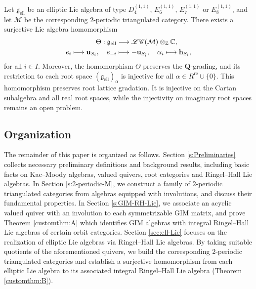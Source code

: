 \documentclass[12pt,reqno]{amsart}
\numberwithin{equation}{section}
\newenvironment{customthm}[1]
{\renewcommand\theinnercustomthm{#1}\innercustomthm}
{\endinnercustomthm}
\begin{document}
	
	\begin{customthm}{{\bf B}}[Theorem \ref{thm:relization-ell-Lie}]
		\label{customthm:B}
		Let $\mathfrak{g}_{\mathrm{ell}}$ be an elliptic Lie algebra of type $D_4^{(1,1)}$, $E_6^{(1,1)}$, $E_7^{(1,1)}$ or $E_8^{(1,1)}$, and let $\mathcal{M}$ be the corresponding $2$-periodic triangulated category. There exists a surjective Lie algebra homomorphism
		\begin{align*}
			\Theta:\mathfrak{g}_{\mathrm{ell}} &\longrightarrow \mathscr{LC}(\mathcal{M})\otimes_{\mathbb{Z}}\mathbb{C},\\
			e_i \longmapsto {\bf u}_{S_i},\quad
			e_{-i} &\longmapsto -{\bf u}_{ S_{\bar i}},\quad
			\alpha_i \longmapsto {\bf h}_{S_i},
		\end{align*}
		for all $i\in I$.
		Moreover, the homomorphism $\Theta$ preserves the $\mathbf{Q}$-grading, and its restriction to each root space $(\mathfrak{g}_{\mathrm{ell}})_\alpha$ is injective for all $\alpha\in R^{\mathrm{re}}\cup\{0\}$.
	\end{customthm}
	This homomorphism preserves root lattice gradation. It is injective on the Cartan subalgebra and all real root spaces, while the injectivity on imaginary root spaces remains an open problem.
	
	
	\subsection{Organization}
	The remainder of this paper is organized as follows. Section \ref{s:Preliminaries} collects necessary preliminary definitions and background results, including basic facts on Kac--Moody algebras, valued quivers, root categories and Ringel--Hall Lie algebras. In Section \ref{s:2-periodic-M}, we construct a family of $2$-periodic triangulated categories from algebras equipped with involutions, and discuss their fundamental properties. In Section \ref{s:GIM-RH-Lie}, we associate an acyclic valued quiver with an involution to each symmetrizable GIM matrix, and prove Theorem \ref{customthm:A} which identifies GIM algebras with integral Ringel--Hall Lie algebras of certain orbit categories.  Section \ref{sec:ell-Lie} focuses on the realization of elliptic Lie algebras via Ringel--Hall Lie algebras. By taking suitable quotients of the aforementioned quivers, we build the corresponding $2$-periodic triangulated categories and establish a surjective homomorphism from each elliptic Lie algebra to its associated integral Ringel--Hall Lie algebra (Theorem \ref{customthm:B}).
	
\end{document}
